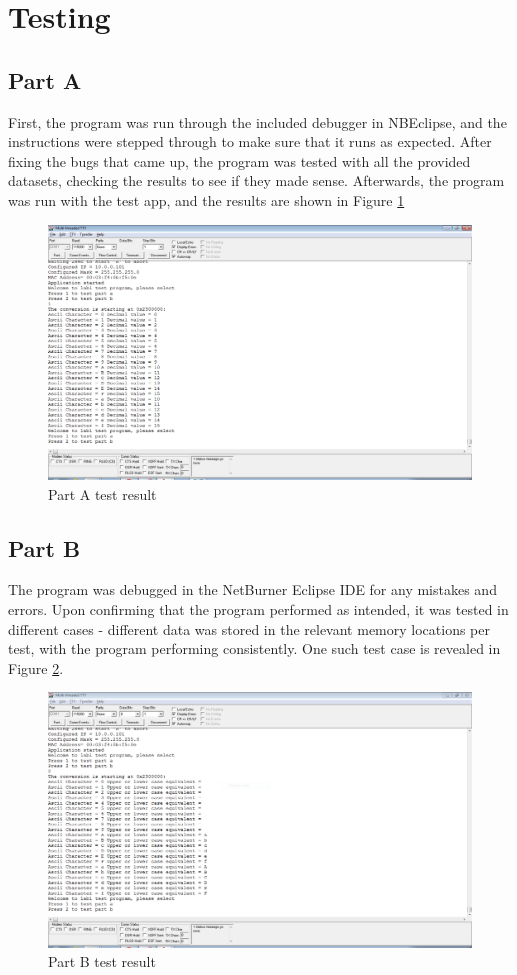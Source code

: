 \documentclass[12pt]{article}
\begin{document}
\section{Testing}
\subsection{Part A}
    First, the program was run through the included debugger in NBEclipse, and the instructions were stepped through to make sure that it runs as expected. After fixing the bugs that came up, the program was tested with all the provided datasets, checking the results to see if they made sense. Afterwards, the program was run with the test app, and the results are shown in Figure \ref{fig:PartATest}
    \begin{figure}
    \centering
    \includegraphics[scale = 0.45]{1ads0}
    \caption{Part A test result}
    \label{fig:PartATest}
    \end{figure}
\subsection{Part B}
    The program was debugged in the NetBurner Eclipse IDE for any mistakes and errors. Upon confirming that the program performed as intended, it was tested in different cases - different data was stored in the relevant memory locations per test, with the program performing consistently. One such test case is revealed in Figure \ref{fig:PartBTest}.
    
    \begin{figure}
    \centering
    \includegraphics[scale = 0.45]{1bds0.PNG}
    \caption{Part B test result}
    \label{fig:PartBTest}
    \end{figure}
\end{document}
